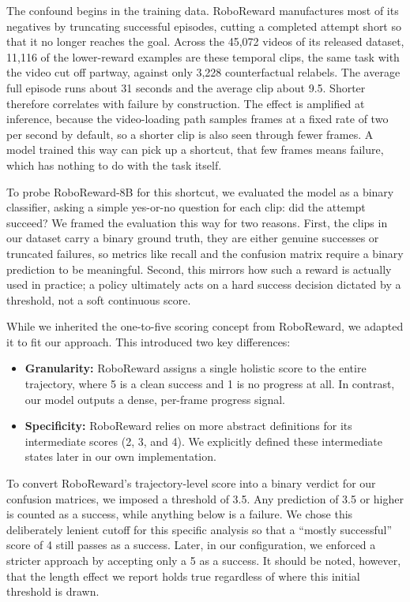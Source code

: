 The confound begins in the training data. RoboReward manufactures most of its negatives by truncating successful episodes, cutting a completed attempt short so that it no longer reaches the goal. Across the 45{,}072 videos of its released dataset, 11{,}116 of the lower-reward examples are these temporal clips, the same task with the video cut off partway, against only 3{,}228 counterfactual relabels. The average full episode runs about 31 seconds and the average clip about 9.5. Shorter therefore correlates with failure by construction. The effect is amplified at inference, because the video-loading path samples frames at a fixed rate of two per second by default, so a shorter clip is also seen through fewer frames. A model trained this way can pick up a shortcut, that few frames means failure, which has nothing to do with the task itself.

To probe RoboReward-8B for this shortcut, we evaluated the model as a binary classifier, asking a simple yes-or-no question for each clip: did the attempt succeed? We framed the evaluation this way for two reasons. First, the clips in our dataset carry a binary ground truth, they are either genuine successes or truncated failures, so metrics like recall and the confusion matrix require a binary prediction to be meaningful. Second, this mirrors how such a reward is actually used in practice; a policy ultimately acts on a hard success decision dictated by a threshold, not a soft continuous score. 

While we inherited the one-to-five scoring concept from RoboReward, we adapted it to fit our approach. This introduced two key differences:
\begin{itemize}
    \item \textbf{Granularity:} RoboReward assigns a single holistic score to the entire trajectory, where 5 is a clean success and 1 is no progress at all. In contrast, our model outputs a dense, per-frame progress signal. 
    \item \textbf{Specificity:} RoboReward relies on more abstract definitions for its intermediate scores (2, 3, and 4). We explicitly defined these intermediate states later in our own implementation. 
\end{itemize}

To convert RoboReward's trajectory-level score into a binary verdict for our confusion matrices, we imposed a threshold of 3.5. Any prediction of 3.5 or higher is counted as a success, while anything below is a failure. We chose this deliberately lenient cutoff for this specific analysis so that a ``mostly successful'' score of 4 still passes as a success. Later, in our configuration, we enforced a stricter approach by accepting only a 5 as a success. It should be noted, however, that the length effect we report holds true regardless of where this initial threshold is drawn.

